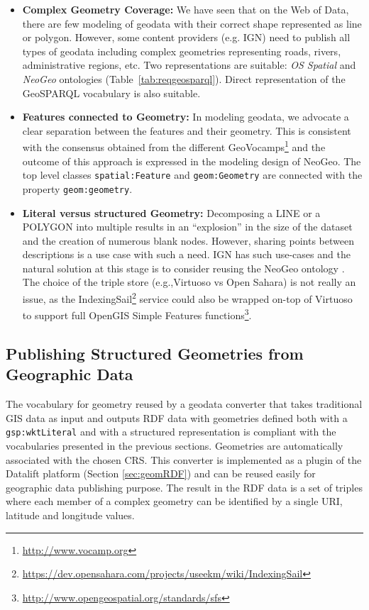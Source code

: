 \begin{itemize}
\item\textbf{Complex Geometry Coverage:} We have seen that on the Web of Data, there are few modeling of geodata with their correct shape represented as line or polygon. However, some content providers (e.g. IGN) need to publish all types of geodata including complex geometries representing roads, rivers, administrative regions, etc. Two representations are suitable: \textit{OS Spatial} and \textit{NeoGeo} ontologies (Table~\ref{tab:reqgeosparql}). Direct representation of the GeoSPARQL vocabulary is also suitable.
\item \textbf{Features connected to Geometry:} In modeling geodata, we advocate a clear separation between the features and their geometry. This is consistent with the consensus obtained from the different GeoVocamps\footnote{\url{http://www.vocamp.org}} and the outcome of this approach is expressed in the modeling design of NeoGeo. The top level classes \texttt{spatial:Feature} and \texttt{geom:Geometry} are connected with the property \texttt{geom:geometry}.

\item \textbf{Literal versus structured Geometry:} Decomposing a LINE or a POLYGON into multiple results in an ``explosion'' in the size of the dataset and the creation of numerous blank nodes. However, sharing points between descriptions is a use case with such a need. IGN has such use-cases and the natural solution at this stage is to consider reusing the NeoGeo ontology . The choice of the triple store (e.g.,Virtuoso vs Open Sahara) is not really an issue, as the IndexingSail\footnote{\url{https://dev.opensahara.com/projects/useekm/wiki/IndexingSail}} service could also be wrapped on-top of Virtuoso to support full OpenGIS Simple Features functions\footnote{\url{http://www.opengeospatial.org/standards/sfs}}.
\end{itemize}


\subsection*{Publishing Structured Geometries from Geographic Data}
The vocabulary for geometry reused by a geodata converter that takes traditional GIS data as input and outputs RDF data with geometries defined both with a \texttt{gsp:wktLiteral} and with a structured representation is compliant with the vocabularies presented in the previous sections. Geometries are automatically associated with the chosen CRS. This converter is implemented as a plugin of the Datalift platform (Section \ref{sec:geomRDF}) and can be reused easily for geographic data publishing purpose. The result in the RDF data is a set of triples where each member of a complex geometry can be identified by a single URI, latitude and longitude values.



